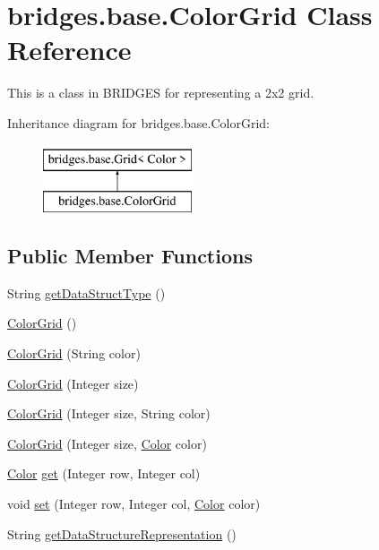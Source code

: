 \hypertarget{classbridges_1_1base_1_1_color_grid}{}\section{bridges.\+base.\+Color\+Grid Class Reference}
\label{classbridges_1_1base_1_1_color_grid}


This is a class in B\+R\+I\+D\+G\+ES for representing a 2x2 grid.  


Inheritance diagram for bridges.\+base.\+Color\+Grid\+:\begin{figure}[H]
\begin{center}
\leavevmode
\includegraphics[height=2.000000cm]{classbridges_1_1base_1_1_color_grid}
\end{center}
\end{figure}
\subsection*{Public Member Functions}
\begin{DoxyCompactItemize}
\item 
String \mbox{\hyperlink{classbridges_1_1base_1_1_color_grid_a53a1f3f105f8545796f98e5fac559b5b}{get\+Data\+Struct\+Type}} ()
\item 
\mbox{\hyperlink{classbridges_1_1base_1_1_color_grid_af434a5a3dcbaf86e51ac6f9e1c1d7e5f}{Color\+Grid}} ()
\item 
\mbox{\hyperlink{classbridges_1_1base_1_1_color_grid_ab6402fcf5ca5047ac2043df57b5c32bd}{Color\+Grid}} (String color)
\item 
\mbox{\hyperlink{classbridges_1_1base_1_1_color_grid_a1c000a64a7f37ae4e0314d01e0da3f67}{Color\+Grid}} (Integer size)
\item 
\mbox{\hyperlink{classbridges_1_1base_1_1_color_grid_a3ed0ac3fbf782e1af16e132bfb6fad71}{Color\+Grid}} (Integer size, String color)
\item 
\mbox{\hyperlink{classbridges_1_1base_1_1_color_grid_a51e4fd5e2b0d1c467d5eaf6860b5264a}{Color\+Grid}} (Integer size, \mbox{\hyperlink{classbridges_1_1base_1_1_color}{Color}} color)
\item 
\mbox{\hyperlink{classbridges_1_1base_1_1_color}{Color}} \mbox{\hyperlink{classbridges_1_1base_1_1_color_grid_a0ab67c85074cd22a2c78ec4ac8a3821e}{get}} (Integer row, Integer col)
\item 
void \mbox{\hyperlink{classbridges_1_1base_1_1_color_grid_a93b29af9bb21b2bf6e52bc3fda9ff34a}{set}} (Integer row, Integer col, \mbox{\hyperlink{classbridges_1_1base_1_1_color}{Color}} color)
\item 
String \mbox{\hyperlink{classbridges_1_1base_1_1_color_grid_a81ca0995d17b6cb31122b718dfa57286}{get\+Data\+Structure\+Representation}} ()
\end{DoxyCompactItemize}
